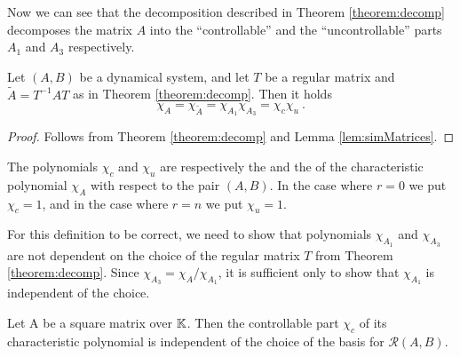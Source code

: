 Now we can see that the decomposition described in Theorem \ref{theorem:decomp} decomposes the matrix $A$ into the ``controllable'' and the ``uncontrollable'' parts $A_1$ and $A_3$ respectively.

\begin{cor}
	Let $(A,B)$ be a dynamical system, and let $T$ be a regular matrix and $\widetilde{A}=T^{-1}AT$ as in Theorem \ref{theorem:decomp}. Then it holds
	$$\chi_A=\chi_{\widetilde{A}}=\chi_{A_1}\chi_{A_3}=\chi_c\chi_u\ .$$
\end{cor} 

\begin{proof}
	Follows from Theorem \ref{theorem:decomp} and Lemma \ref{lem:simMatrices}.
\end{proof}

\begin{definition}
	The polynomials $\chi_c$ and $\chi_u$ are respectively the  and the  of the characteristic polynomial $\chi_A$ with respect to the pair $(A,B)$. In the case where $r=0$ we put $\chi_c=1$, and in the case where $r=n$ we put $\chi_u=1$.
\end{definition}

For this definition to be correct, we need to show that polynomials $\chi_{A_1}$ and $\chi_{A_3}$ are not dependent on the choice of the regular matrix $T$ from Theorem \ref{theorem:decomp}. Since $\chi_{A_3}=\chi_A/\chi_{A_1}$, it is sufficient only to show that $\chi_{A_1}$ is independent of the choice.

\begin{claim}
	Let A be a square matrix over $\mathbb{K}$. Then the controllable part $\chi_c$ of its characteristic polynomial is independent of the choice of the basis for $\mathcal{R}(A,B)$.
\end{claim}

